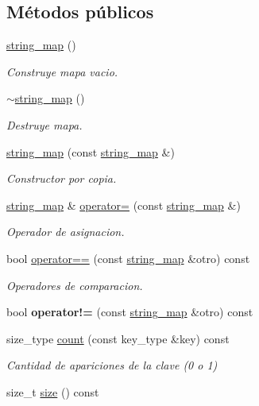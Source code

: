 \subsection*{Métodos públicos}
\begin{DoxyCompactItemize}
\item 
\hyperlink{classstring__map_acd7803d493b09db56e2e9022e526def7}{string\-\_\-map} ()
\begin{DoxyCompactList}\small\item\em Construye mapa vacio. \end{DoxyCompactList}\item 
\hyperlink{classstring__map_a37b201370c0a6a3c2aa488dedbc0a9d7}{$\sim$string\-\_\-map} ()
\begin{DoxyCompactList}\small\item\em Destruye mapa. \end{DoxyCompactList}\item 
\hyperlink{classstring__map_afa602ae4726c1dc0a562652107cdabfd}{string\-\_\-map} (const \hyperlink{classstring__map}{string\-\_\-map} \&)
\begin{DoxyCompactList}\small\item\em Constructor por copia. \end{DoxyCompactList}\item 
\hyperlink{classstring__map}{string\-\_\-map} \& \hyperlink{classstring__map_aa7099ce0e833b1d7b55990870d3cddac}{operator=} (const \hyperlink{classstring__map}{string\-\_\-map} \&)
\begin{DoxyCompactList}\small\item\em Operador de asignacion. \end{DoxyCompactList}\item 
bool \hyperlink{classstring__map_a424a95ef628cc97aeedae51f98ee2345}{operator==} (const \hyperlink{classstring__map}{string\-\_\-map} \&otro) const 
\begin{DoxyCompactList}\small\item\em Operadores de comparacion. \end{DoxyCompactList}\item 
\hypertarget{classstring__map_aaa9e3e8289202b72f1b0b7b0268c3fe7}{bool {\bfseries operator!=} (const \hyperlink{classstring__map}{string\-\_\-map} \&otro) const }\label{classstring__map_aaa9e3e8289202b72f1b0b7b0268c3fe7}

\item 
size\-\_\-type \hyperlink{classstring__map_a66402d4dcc1216dbcd32b0f182094a99}{count} (const key\-\_\-type \&key) const 
\begin{DoxyCompactList}\small\item\em Cantidad de apariciones de la clave (0 o 1) \end{DoxyCompactList}\item 
\hypertarget{classstring__map_af4943b5e157f925a5085852b1e3ffac1}{size\-\_\-t \hyperlink{classstring__map_af4943b5e157f925a5085852b1e3ffac1}{size} () const }\label{classstring__map_af4943b5e157f925a5085852b1e3ffac1}


\end{DoxyCompactItemize}

